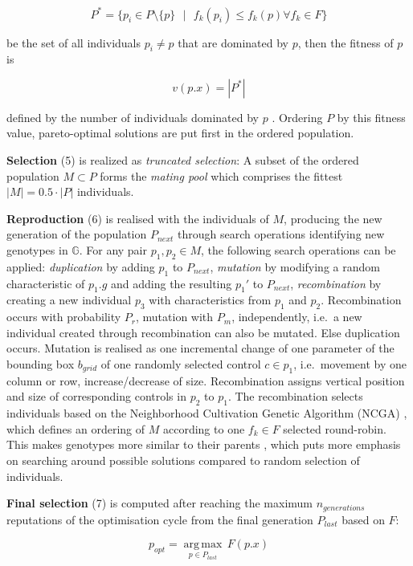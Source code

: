 \[P^* = \{p_i \in P \setminus\{p\}  \text{ }|\text{ } f_k(p_i) \leq f_k(p) \forall f_k \in F \}\]

be the set of all individuals \(p_i \neq p\) that are dominated by \(p\), then the fitness of \(p\) is

\[v(p.x) = |P^*|\]

defined by the number of individuals dominated by \(p\) \autocite{Weise2009Optimization}.
Ordering \(P\) by this fitness value, pareto-optimal solutions are put first in the ordered population.

\textbf{Selection} (5) is realized as \emph{truncated selection}: A subset of the ordered population \(M \subset P\) forms the \emph{mating pool} which comprises the fittest \(|M| = 0.5 \cdot |P|\) individuals.

\textbf{Reproduction} (6) is realised with the individuals of \(M\), producing the new generation of the population \(P_{next}\) through search operations identifying new genotypes in \(\mathbb{G}\).
For any pair \(p_1, p_2 \in M\), the following search operations can be applied: \emph{duplication} by adding \(p_1\) to \(P_{next}\), \emph{mutation} by modifying a random characteristic of \(p_1.g\) and adding the resulting \(p_1'\) to \(P_{next}\), \emph{recombination} by creating a new individual \(p_3\) with characteristics from \(p_1\) and \(p_2\).
Recombination occurs with probability \(P_{r}\), mutation with \(P_m\), independently, i.e.~a new individual created through recombination can also be mutated.
Else duplication occurs.
Mutation is realised as one incremental change of one parameter of the bounding box \(b_{grid}\) of one randomly selected control \(c \in p_1\), i.e.~movement by one column or row, increase/decrease of size.
Recombination assigns vertical position and size of corresponding controls in \(p_2\) to \(p_1\).
The recombination selects individuals based on the Neighborhood Cultivation Genetic Algorithm (NCGA) \autocite{Watanabe2002NCGA}, which defines an ordering of \(M\) according to one \(f_k\in F\) selected round-robin.
This makes genotypes more similar to their parents \autocite{Weise2009Optimization}, which puts more emphasis on searching around possible solutions compared to random selection of individuals.

\textbf{Final selection} (7) is computed after reaching the maximum \(n_{generations}\) reputations of the optimisation cycle from the final generation \(P_{last}\) based on \(F\):

\[p_{opt} = \underset{p \in P_{last}}{\operatorname{arg\,max}}\, F(p.x)\]

